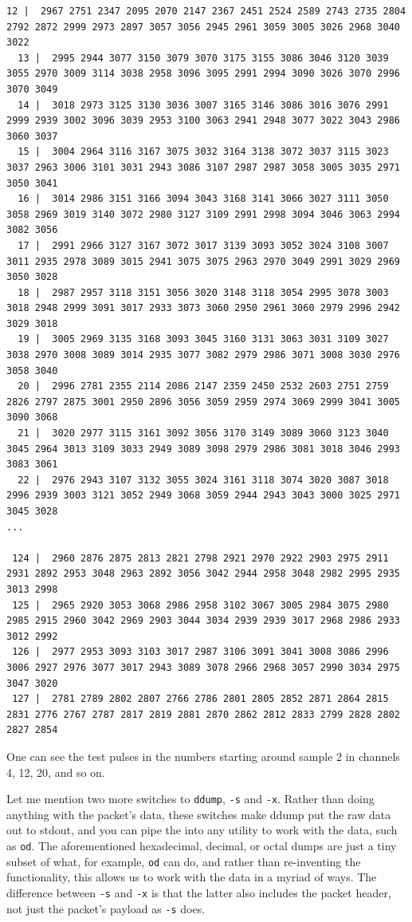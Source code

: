 \documentclass{article}[11pt]
\begin{document}
\begin{Verbatim}[fontsize=\tiny]
  12 |  2967 2751 2347 2095 2070 2147 2367 2451 2524 2589 2743 2735 2804 2792 2872 2999 2973 2897 3057 3056 2945 2961 3059 3005 3026 2968 3040 3022
  13 |  2995 2944 3077 3150 3079 3070 3175 3155 3086 3046 3120 3039 3055 2970 3009 3114 3038 2958 3096 3095 2991 2994 3090 3026 3070 2996 3070 3049
  14 |  3018 2973 3125 3130 3036 3007 3165 3146 3086 3016 3076 2991 2999 2939 3002 3096 3039 2953 3100 3063 2941 2948 3077 3022 3043 2986 3060 3037
  15 |  3004 2964 3116 3167 3075 3032 3164 3138 3072 3037 3115 3023 3037 2963 3006 3101 3031 2943 3086 3107 2987 2987 3058 3005 3035 2971 3050 3041
  16 |  3014 2986 3151 3166 3094 3043 3168 3141 3066 3027 3111 3050 3058 2969 3019 3140 3072 2980 3127 3109 2991 2998 3094 3046 3063 2994 3082 3056
  17 |  2991 2966 3127 3167 3072 3017 3139 3093 3052 3024 3108 3007 3011 2935 2978 3089 3015 2941 3075 3075 2963 2970 3049 2991 3029 2969 3050 3028
  18 |  2987 2957 3118 3151 3056 3020 3148 3118 3054 2995 3078 3003 3018 2948 2999 3091 3017 2933 3073 3060 2950 2961 3060 2979 2996 2942 3029 3018
  19 |  3005 2969 3135 3168 3093 3045 3160 3131 3063 3031 3109 3027 3038 2970 3008 3089 3014 2935 3077 3082 2979 2986 3071 3008 3030 2976 3058 3040
  20 |  2996 2781 2355 2114 2086 2147 2359 2450 2532 2603 2751 2759 2826 2797 2875 3001 2950 2896 3056 3059 2959 2974 3069 2999 3041 3005 3090 3068
  21 |  3020 2977 3115 3161 3092 3056 3170 3149 3089 3060 3123 3040 3045 2964 3013 3109 3033 2949 3089 3098 2979 2986 3081 3018 3046 2993 3083 3061
  22 |  2976 2943 3107 3132 3055 3024 3161 3118 3074 3020 3087 3018 2996 2939 3003 3121 3052 2949 3068 3059 2944 2943 3043 3000 3025 2971 3045 3028
...

 124 |  2960 2876 2875 2813 2821 2798 2921 2970 2922 2903 2975 2911 2931 2892 2953 3048 2963 2892 3056 3042 2944 2958 3048 2982 2995 2935 3013 2998
 125 |  2965 2920 3053 3068 2986 2958 3102 3067 3005 2984 3075 2980 2985 2915 2960 3042 2969 2903 3044 3034 2939 2939 3017 2968 2986 2933 3012 2992
 126 |  2977 2953 3093 3103 3017 2987 3106 3091 3041 3008 3086 2996 3006 2927 2976 3077 3017 2943 3089 3078 2966 2968 3057 2990 3034 2975 3047 3020
 127 |  2781 2789 2802 2807 2766 2786 2801 2805 2852 2871 2864 2815 2831 2776 2767 2787 2817 2819 2881 2870 2862 2812 2833 2799 2828 2802 2827 2854
\end{Verbatim}

One can see the test pulses in the numbers starting around sample 2 in channels 4, 12, 20, and so on.


Let me mention two more switches to \verb|ddump|, \verb|-s| and
\verb|-x|. Rather than doing anything with the packet's data, these
switches make ddump put the raw data out to stdout, and you can pipe
the into any utility to work with the data, such as \verb|od|. The
aforementioned hexadecimal, decimal, or octal dumps are just a tiny
subset of what, for example, \verb|od| can do, and rather than
re-inventing the functionality, this allows us to work with the data
in a myriad of ways. The difference between \verb|-s| and \verb|-x| is
that the latter also includes the packet header, not just the packet's
payload as \verb|-s| does.
\end{document}
